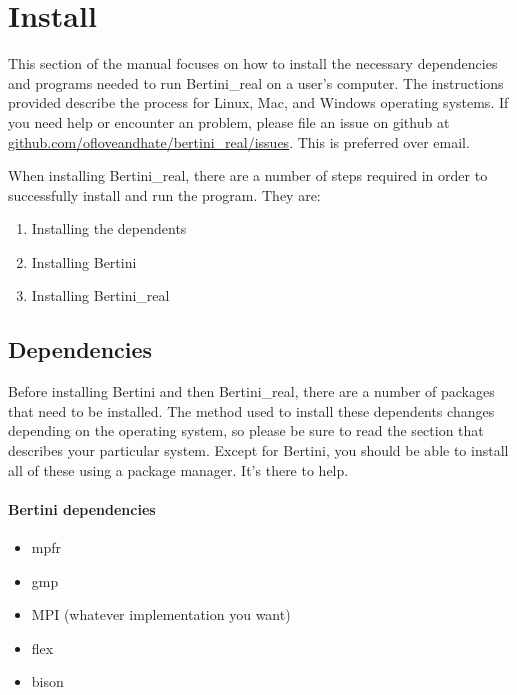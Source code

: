 
\section{Install}


\label{sec:installation}
	This section of the manual focuses on how to install the necessary dependencies and programs needed to run Bertini\_real on a user's computer. The instructions provided describe the process for Linux, Mac, and Windows operating systems.  If you need help or encounter an problem, please file an issue on github at \href{https://github.com/ofloveandhate/bertini_real/issues}{github.com/ofloveandhate/bertini\_real/issues}.  This is preferred over email.

	When installing Bertini\_real, there are a number of steps required in order to successfully install and run the program. They are:
\begin{enumerate}
\item Installing the \glspl{dependent}
\item Installing Bertini
\item Installing Bertini\_real
\end{enumerate}




\subsection{Dependencies}
\label{sec:deps}

Before installing Bertini and then Bertini\_real, there are a number of packages that need to be installed. The method used to install these \glspl{dependent} changes depending on the operating system, so please be sure to read the section that describes your particular system.  Except for Bertini, you should be able to install all of these using a package manager.  It's there to help.

\paragraph{Bertini dependencies}

\begin{itemize}[noitemsep]
\item \gls{mpfr}
\item \gls{gmp}
\item MPI (whatever implementation you want)
\item flex
\item bison
\end{itemize}


